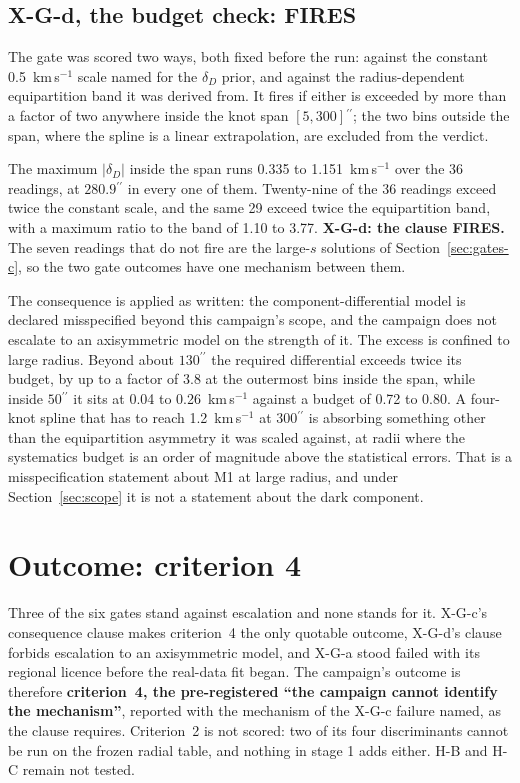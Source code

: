 \documentclass[11pt]{article}
\newcommand{\as}{\ensuremath{^{\prime\prime}}}
\newcommand{\dD}{\ensuremath{\delta_D}}
\begin{document}
\subsection{X-G-d, the budget check: FIRES}
\label{sec:gates-d}

The gate was scored two ways, both fixed before the run: against the constant 0.5~km\,s$^{-1}$ scale named for the \dD{} prior, and against the radius-dependent equipartition band it was derived from. It fires if either is exceeded by more than a factor of two anywhere inside the knot span $[5, 300]\as$; the two bins outside the span, where the spline is a linear extrapolation, are excluded from the verdict.

The maximum $|\dD|$ inside the span runs 0.335 to 1.151~km\,s$^{-1}$ over the 36 readings, at $280.9\as$ in every one of them. Twenty-nine of the 36 readings exceed twice the constant scale, and the same 29 exceed twice the equipartition band, with a maximum ratio to the band of 1.10 to 3.77. \textbf{X-G-d: the clause FIRES.} The seven readings that do not fire are the large-$s$ solutions of Section~\ref{sec:gates-c}, so the two gate outcomes have one mechanism between them.

The consequence is applied as written: the component-differential model is declared misspecified beyond this campaign's scope, and the campaign does not escalate to an axisymmetric model on the strength of it. The excess is confined to large radius. Beyond about $130\as$ the required differential exceeds twice its budget, by up to a factor of 3.8 at the outermost bins inside the span, while inside $50\as$ it sits at 0.04 to 0.26~km\,s$^{-1}$ against a budget of 0.72 to 0.80. A four-knot spline that has to reach 1.2~km\,s$^{-1}$ at $300\as$ is absorbing something other than the equipartition asymmetry it was scaled against, at radii where the systematics budget is an order of magnitude above the statistical errors. That is a misspecification statement about M1 at large radius, and under Section~\ref{sec:scope} it is not a statement about the dark component.

\section{Outcome: criterion 4}
\label{sec:outcome}

Three of the six gates stand against escalation and none stands for it. X-G-c's consequence clause makes criterion~4 the only quotable outcome, X-G-d's clause forbids escalation to an axisymmetric model, and X-G-a stood failed with its regional licence before the real-data fit began. The campaign's outcome is therefore \textbf{criterion~4, the pre-registered ``the campaign cannot identify the mechanism''}, reported with the mechanism of the X-G-c failure named, as the clause requires. Criterion~2 is not scored: two of its four discriminants cannot be run on the frozen radial table, and nothing in stage 1 adds either. H-B and H-C remain not tested.
\end{document}
